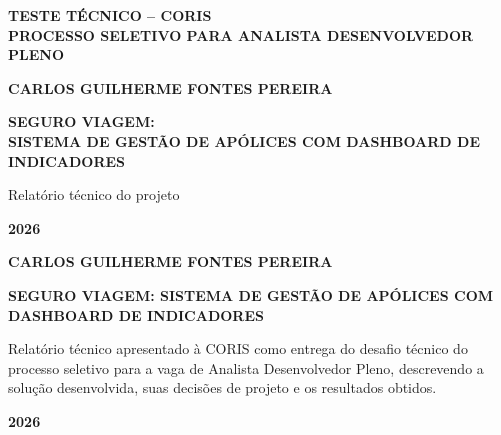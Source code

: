 \documentclass[12pt,a4paper]{article}
\begin{document}
\begin{titlepage}
  \centering
  {\bfseries TESTE TÉCNICO -- CORIS\\ PROCESSO SELETIVO PARA ANALISTA DESENVOLVEDOR PLENO\par}
  \vspace{4cm}
  {\bfseries CARLOS GUILHERME FONTES PEREIRA\par}
  \vfill
  {\Large\bfseries SEGURO VIAGEM:\\[0.3em] SISTEMA DE GESTÃO DE APÓLICES COM DASHBOARD DE INDICADORES\par}
  \vspace{1em}
  {Relatório técnico do projeto\par}
  \vfill
  {\bfseries 2026\par}
\end{titlepage}

\thispagestyle{empty}
\begin{center}
  {\bfseries CARLOS GUILHERME FONTES PEREIRA\par}
  \vspace{5cm}
  {\large\bfseries SEGURO VIAGEM: SISTEMA DE GESTÃO DE APÓLICES COM DASHBOARD DE INDICADORES\par}
\end{center}
\vspace{2cm}
\begin{flushright}
\begin{minipage}{0.55\textwidth}
  \singlespacing\small
  Relatório técnico apresentado à CORIS como entrega do desafio técnico do processo seletivo
  para a vaga de Analista Desenvolvedor Pleno, descrevendo a solução desenvolvida, suas decisões
  de projeto e os resultados obtidos.
\end{minipage}
\end{flushright}
\vfill
\begin{center}{\bfseries 2026\par}\end{center}
\newpage

\thispagestyle{empty}
\renewcommand{\listtablename}{LISTA DE TABELAS}
\renewcommand{\contentsname}{SUMÁRIO}
\begin{singlespace}
\listoftables
\end{singlespace}
\newpage
\thispagestyle{empty}
\begin{singlespace}
\tableofcontents
\end{singlespace}
\newpage
\end{document}
